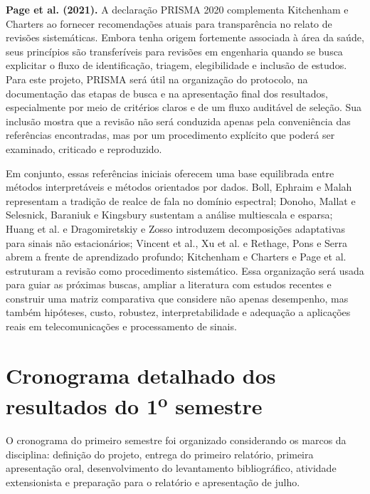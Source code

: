 \noindent\textbf{Page et al. (2021).} A declaração PRISMA 2020 complementa Kitchenham e Charters ao fornecer recomendações atuais para transparência no relato de revisões sistemáticas. Embora tenha origem fortemente associada à área da saúde, seus princípios são transferíveis para revisões em engenharia quando se busca explicitar o fluxo de identificação, triagem, elegibilidade e inclusão de estudos. Para este projeto, PRISMA será útil na organização do protocolo, na documentação das etapas de busca e na apresentação final dos resultados, especialmente por meio de critérios claros e de um fluxo auditável de seleção. Sua inclusão mostra que a revisão não será conduzida apenas pela conveniência das referências encontradas, mas por um procedimento explícito que poderá ser examinado, criticado e reproduzido.

Em conjunto, essas referências iniciais oferecem uma base equilibrada entre métodos interpretáveis e métodos orientados por dados. Boll, Ephraim e Malah representam a tradição de realce de fala no domínio espectral; Donoho, Mallat e Selesnick, Baraniuk e Kingsbury sustentam a análise multiescala e esparsa; Huang et al. e Dragomiretskiy e Zosso introduzem decomposições adaptativas para sinais não estacionários; Vincent et al., Xu et al. e Rethage, Pons e Serra abrem a frente de aprendizado profundo; Kitchenham e Charters e Page et al. estruturam a revisão como procedimento sistemático. Essa organização será usada para guiar as próximas buscas, ampliar a literatura com estudos recentes e construir uma matriz comparativa que considere não apenas desempenho, mas também hipóteses, custo, robustez, interpretabilidade e adequação a aplicações reais em telecomunicações e processamento de sinais.

\newpage

\section{Cronograma detalhado dos resultados do \texorpdfstring{1\textsuperscript{o}}{1o} semestre}

O cronograma do primeiro semestre foi organizado considerando os marcos da disciplina: definição do projeto, entrega do primeiro relatório, primeira apresentação oral, desenvolvimento do levantamento bibliográfico, atividade extensionista e preparação para o relatório e apresentação de julho.

